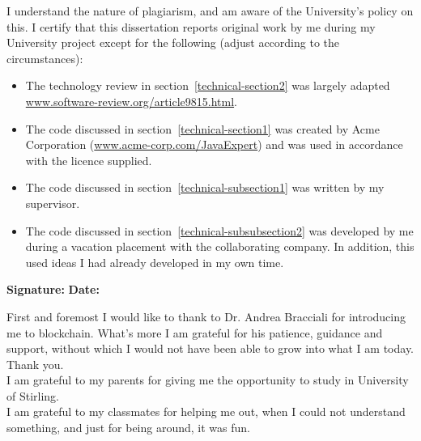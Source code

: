 \documentclass[a4paper,11pt]{report}
\begin{document}


I understand the nature of plagiarism, and am aware of the University's policy
on this. I certify that this dissertation reports original work by me during my
University project except for the following (adjust according to the
circumstances):

\begin{itemize}

  \item
  The technology review in section~\ref{technical-section2} was largely adapted
  \url{www.software-review.org/article9815.html}.

  \item
  The code discussed in section~\ref{technical-section1} was created by Acme
  Corporation (\url{www.acme-corp.com/JavaExpert}) and was used in accordance
  with the licence supplied.

  \item
  The code discussed in section~\ref{technical-subsection1} was written by my
  supervisor.

  \item
  The code discussed in section~\ref{technical-subsubsection2} was developed by
  me during a vacation placement with the collaborating company. In addition,
  this used ideas I had already developed in my own time.

\end{itemize}

\bigskip

{\bf Signature:} \hspace{20em} {\bf Date:}




First and foremost I would like to thank to Dr. Andrea Bracciali for introducing me to blockchain. What's more I am grateful for his patience, guidance and support, without which I would not have been able to grow into what I am today. Thank you.
\\

I am grateful to my parents for giving me the opportunity to study in University of Stirling. 
\\

I am grateful to my classmates for helping me out, when I could not understand something, and just for being around, it was fun. 
\\
\end{document}
